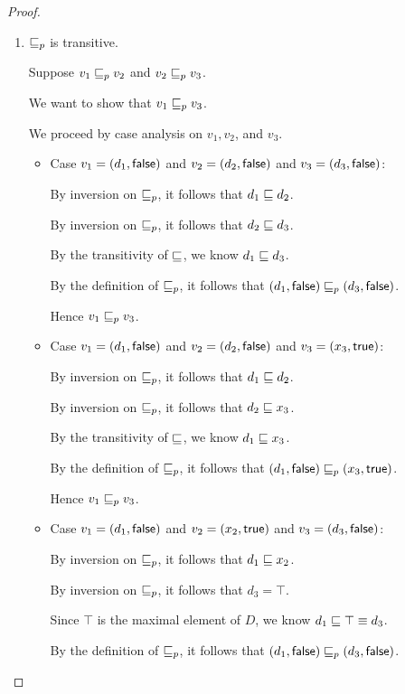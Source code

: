 \begin{proof}
\begin{enumerate}
\begin{enumerate}
    \item $\sqsubseteq_p$ is transitive. 

      Suppose $v_1 \sqsubseteq_p v_2$ and $v_2 \sqsubseteq_p v_3$.

      We want to show that $v_1 \sqsubseteq_p v_3$.

      We proceed by case analysis on $v_1, v_2$, and $v_3$.
      \begin{itemize}
      \item Case $v_1 = (d_1, \textsf{false})$ and $v_2 =
        (d_2, \textsf{false})$ and $v_3 =
        (d_3, \textsf{false})$:
        
        By inversion on $\sqsubseteq_p$, it follows that $d_1 \sqsubseteq d_2$.

        By inversion on $\sqsubseteq_p$, it follows that $d_2 \sqsubseteq d_3$.

        By the transitivity of $\sqsubseteq$, we know $d_1 \sqsubseteq d_3$.

        By the definition of $\sqsubseteq_p$, it follows that
        $(d_1, \textsf{false}) \sqsubseteq_p (d_3, \textsf{false})$.

        Hence $v_1 \sqsubseteq_p v_3$.

      \item Case $v_1 = (d_1, \textsf{false})$ and $v_2 =
        (d_2, \textsf{false})$ and $v_3 =
        (x_3, \textsf{true})$:

        By inversion on $\sqsubseteq_p$, it follows that $d_1 \sqsubseteq d_2$.

        By inversion on $\sqsubseteq_p$, it follows that $d_2 \sqsubseteq x_3$.

        By the transitivity of $\sqsubseteq$, we know $d_1 \sqsubseteq x_3$.

        By the definition of $\sqsubseteq_p$, it follows that
        $(d_1, \textsf{false}) \sqsubseteq_p (x_3, \textsf{true})$.

        Hence $v_1 \sqsubseteq_p v_3$.

      \item Case $v_1 = (d_1, \textsf{false})$ and $v_2 =
        (x_2, \textsf{true})$ and $v_3 =
        (d_3, \textsf{false})$:

        By inversion on $\sqsubseteq_p$, it follows that $d_1 \sqsubseteq x_2$.

        By inversion on $\sqsubseteq_p$, it follows that $d_3 = \top$.

        Since $\top$ is the maximal element of $D$, we know $d_1
        \sqsubseteq \top \equiv d_3$.

        By the definition of $\sqsubseteq_p$, it follows that
        $(d_1, \textsf{false}) \sqsubseteq_p (d_3, \textsf{false})$.


\end{itemize}
\end{enumerate}
\end{enumerate}
\end{proof}
